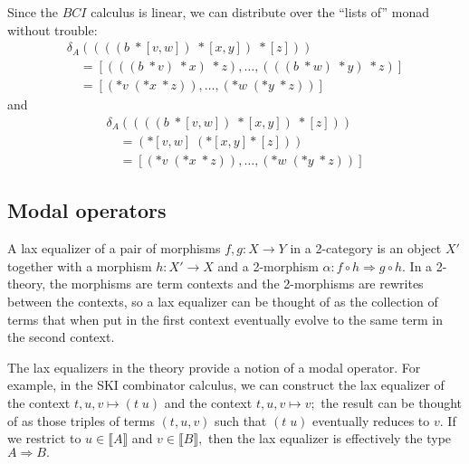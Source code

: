 \documentclass[]{acm_proc_article-sp}
\newcommand{\maps}{\colon}
\numberwithin{equation}{subsection}
\begin{document}
Since the $BCI$ calculus is linear, we can distribute over the ``lists of'' monad without trouble:
  \[\begin{array}{l}
    \delta_A((((b\; *[v, w])\; *[x, y])\; *[z])) \\
    \quad   = [(((b\; *v)\; *x)\; *z), \ldots, (((b\; *w)\; *y)\; *z)] \\
    \quad   = [(*v\; (*x\; *z)), \ldots, (*w\; (*y\; *z))]
  \end{array}\]
and
  \[\begin{array}{l}
    \delta_A((((b\; *[v, w])\; *[x, y])\; *[z])) \\
    \quad   = (*[v, w]\; (*[x, y] *[z])) \\
    \quad   = [(*v\; (*x\; *z)), \ldots, (*w\; (*y\; *z))]
  \end{array}\]

\subsection{Modal operators}

A lax equalizer of a pair of morphisms $f, g\maps X \to Y$ in a 2-category is an object $X'$ together with a morphism $h\maps X' \to X$ and a 2-morphism $\alpha\maps f \circ h \Rightarrow g \circ h$.  In a 2-theory, the morphisms are term contexts and the 2-morphisms are rewrites between the contexts, so a lax equalizer can be thought of as the collection of terms that when put in the first context eventually evolve to the same term in the second context.

\begin{center}
\end{center}

The lax equalizers in the theory provide a notion of a modal operator.  For example, in the SKI combinator calculus, we can construct the lax equalizer of the context $t, u, v \mapsto (t\; u)$ and the context $t, u, v \mapsto v;$ the result can be thought of as those triples of terms $(t, u, v)$ such that $(t\; u)$ eventually reduces to $v.$  If we restrict to $u \in \llbracket A \rrbracket$ and $v \in \llbracket B \rrbracket,$ then the lax equalizer is effectively the type $A \Rightarrow B.$
\end{document}
